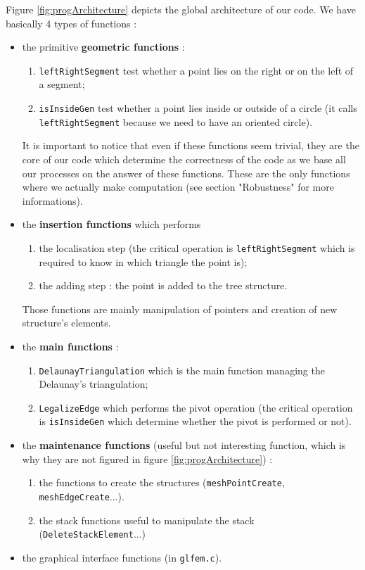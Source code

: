 Figure \ref{fig:progArchitecture} depicts the global architecture of our code. We have basically 4 types of functions : 
\begin{itemize}
\item the primitive \textbf{geometric functions} : 
\begin{enumerate}
\item \texttt{leftRightSegment} test whether a point lies on the right or on the left of a segment;
\item \texttt{isInsideGen} test whether a point lies inside or outside of a circle (it calls \texttt{leftRightSegment} because we need to have an oriented circle).
\end{enumerate}
It is important to notice that even if these functions seem trivial, they are the core of our code which determine the correctness of the code as we base all our processes on the answer of these functions. These are the only functions where we actually make computation (see section "Robustness" for more informations).
\item the \textbf{insertion functions} which performs 
\begin{enumerate}
\item the localisation step (the critical operation is \texttt{leftRightSegment} which is required to know in which triangle the point is);
\item the adding step : the point is added to the tree structure. 
\end{enumerate}
	Those functions are mainly manipulation of pointers and creation of  new structure's elements.
\item the \textbf{main functions} : 
\begin{enumerate}
\item \texttt{DelaunayTriangulation} which is the main function managing the Delaunay's triangulation;
\item \texttt{LegalizeEdge} which performs the pivot operation (the critical operation is \texttt{isInsideGen} which determine whether the pivot is performed or not).
\end{enumerate} 
\item the \textbf{maintenance functions} (useful but not interesting function, which is why they are not figured in figure \ref{fig:progArchitecture}) : 
\begin{enumerate}
\item the functions to create the structures (\texttt{meshPointCreate}, \texttt{meshEdgeCreate}...).
\item the stack functions useful to manipulate the stack (\texttt{DeleteStackElement}...)
\end{enumerate}
\item the graphical interface functions (in \texttt{glfem.c}).
\end{itemize}
